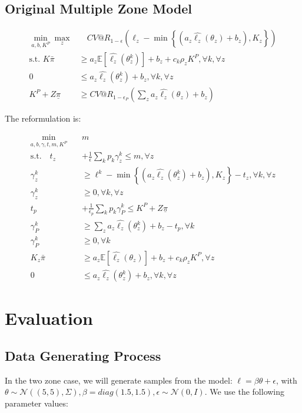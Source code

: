\documentclass[11pt]{article}
\begin{document}
    \subsection*{Original Multiple Zone Model}
    
        \begin{align}
            \min_{a,b,K^P} \max_z &\quad CV@R_{1-\epsilon}(\ell_z - \min\left\{(a_z\hat{\ell_z}(\theta_z) + b_z), K_z\right\})\\
            \text{s.t.   } K\bar{\pi} &\geq a_z \mathbb{E}[\hat{\ell_z}(\theta^k_z)] + b_z + c_k\rho_z K^P,  \forall k, \forall z\\
            0 &\leq a_z\hat{\ell_z}(\theta^k_z) + b_z, \forall k, \forall z \\
            K^P + Z\underline{\pi} &\geq CV@R_{1-\epsilon_P}\left( \sum_z a_z \hat{\ell_z}(\theta_z) + b_z \right)
        \end{align}
        
        The reformulation is: 
        
        \begin{align}
            \min_{a,b,\gamma,t,m,K^P} \quad & m\\
            \text{s.t.} \quad t_z &+ \frac{1}{\epsilon} \sum_k p_k \gamma_z^k \leq m, \forall z\\
            \gamma_z^k &\geq \ell^k - \min\left\{(a_z\hat{\ell_z}(\theta_z^k) + b_z), K_z\right\} -t_z, \forall k, \forall z \\
            \gamma_z^k &\geq 0, \forall k, \forall z\\
            t_p &+ \frac{1}{\epsilon_p} \sum_k p_k \gamma_P^k \leq K^P+Z\underline{\pi}\\
            \gamma_P^k &\geq \sum_z a_z \hat{\ell_z}(\theta^k_z) + b_z -t_p, \forall k \\
            \gamma_P^k &\geq 0, \forall k\\
            K_z\bar{\pi} &\geq a_z \mathbb{E}[\hat{\ell_z}(\theta_z)] + b_z + c_k \rho_z K^P, \forall z \\
            0 &\leq a_z \hat{\ell_z}(\theta_z^k) + b_z, \forall k, \forall z
        \end{align}

    
    
\section{Evaluation}
\subsection*{Data Generating Process}
    In the two zone case, we will generate samples from the model: $\ell = \beta \theta + \epsilon$, with $\theta \sim \mathcal{N}((5,5),\Sigma), \beta = diag(1.5,1.5), \epsilon \sim \mathcal{N}(0,I)$. We use the following parameter values: 
\end{document}
